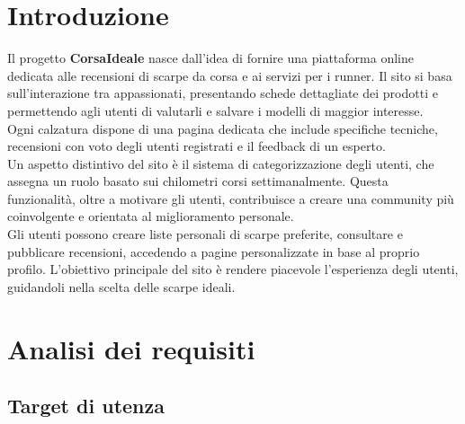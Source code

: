 \documentclass[a4paper, 12pt]{article}
\begin{document}
\newpage
\begin{justify}
    

\section{Introduzione}

Il progetto \textbf{CorsaIdeale} nasce dall'idea di fornire una piattaforma online dedicata alle recensioni di scarpe da corsa e ai servizi per i runner. Il sito si basa sull'interazione tra appassionati, presentando schede dettagliate dei prodotti e permettendo agli utenti di valutarli e salvare i modelli di maggior interesse.\\
Ogni calzatura dispone di una pagina dedicata che include specifiche tecniche, recensioni con voto degli utenti registrati e il feedback di un esperto.\\
Un aspetto distintivo del sito è il sistema di categorizzazione degli utenti, che assegna un ruolo basato sui chilometri corsi settimanalmente. Questa funzionalità, oltre a motivare gli utenti, contribuisce a creare una community più coinvolgente e orientata al miglioramento personale.\\ 
Gli utenti possono creare liste personali di scarpe preferite, consultare e pubblicare recensioni, accedendo a pagine personalizzate in base al proprio profilo. L'obiettivo principale del sito è rendere piacevole l'esperienza degli utenti, guidandoli nella scelta delle scarpe ideali.


\section{Analisi dei requisiti}

\subsection{Target di utenza}


\end{justify}
\end{document}
